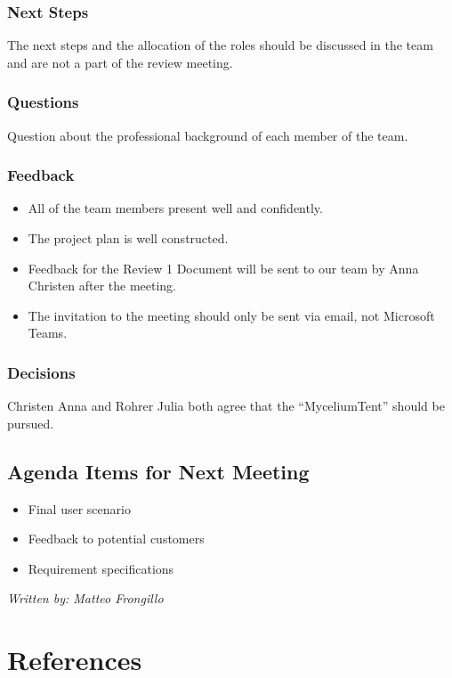 \documentclass{article}
\begin{document}
\subsection{Next Steps}
The next steps and the allocation of the roles should be discussed in the team and are not a part of the review meeting.

\subsection{Questions}
Question about the professional background of each member of the team.

\subsection{Feedback}
\begin{itemize}
    \item All of the team members present well and confidently.
    \item The project plan is well constructed.
    \item Feedback for the Review 1 Document will be sent to our team by Anna Christen after the meeting.
    \item The invitation to the meeting should only be sent via email, not Microsoft Teams.
\end{itemize}

\subsection{Decisions}
Christen Anna and Rohrer Julia both agree that the “MyceliumTent” should be pursued.

\section{Agenda Items for Next Meeting}
\begin{itemize}
    \item Final user scenario
    \item Feedback to potential customers
    \item Requirement specifications
\end{itemize}

\vspace{1cm}
\noindent\textit{Written by: Matteo Frongillo}

\chapter{References}
% 
\end{document}
